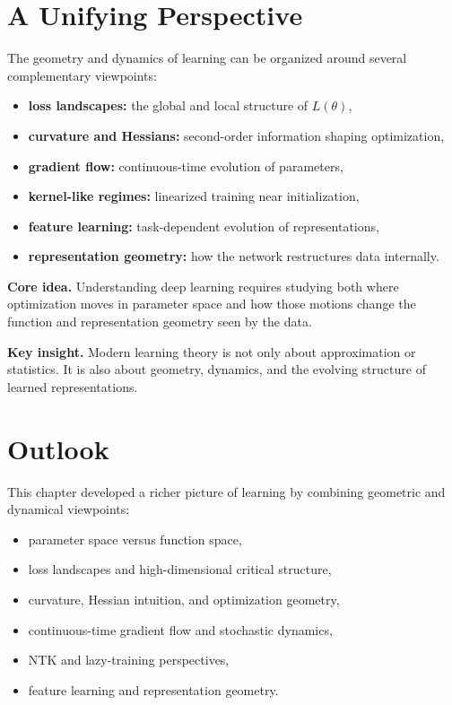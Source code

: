 \section{A Unifying Perspective}

The geometry and dynamics of learning can be organized around several complementary viewpoints:

\begin{itemize}
    \item \textbf{loss landscapes:} the global and local structure of \(L(\theta)\),
    \item \textbf{curvature and Hessians:} second-order information shaping optimization,
    \item \textbf{gradient flow:} continuous-time evolution of parameters,
    \item \textbf{kernel-like regimes:} linearized training near initialization,
    \item \textbf{feature learning:} task-dependent evolution of representations,
    \item \textbf{representation geometry:} how the network restructures data internally.
\end{itemize}

\medskip

\noindent
\textbf{Core idea.}
Understanding deep learning requires studying both where optimization moves in parameter space and how those motions change the function and representation geometry seen by the data.

\medskip

\noindent
\textbf{Key insight.}
Modern learning theory is not only about approximation or statistics. It is also about geometry, dynamics, and the evolving structure of learned representations.

\section{Outlook}

This chapter developed a richer picture of learning by combining geometric and dynamical viewpoints:
\begin{itemize}
    \item parameter space versus function space,
    \item loss landscapes and high-dimensional critical structure,
    \item curvature, Hessian intuition, and optimization geometry,
    \item continuous-time gradient flow and stochastic dynamics,
    \item NTK and lazy-training perspectives,
    \item feature learning and representation geometry.
\end{itemize}

